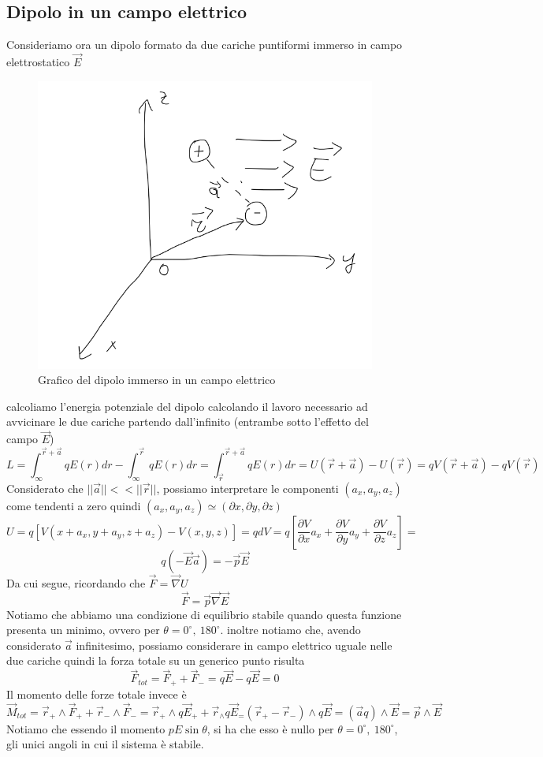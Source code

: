 \documentclass[10pt,a4paper]{article}
\begin{document}
\subsection{Dipolo in un campo elettrico}
Consideriamo ora un dipolo formato da due cariche puntiformi immerso in campo elettrostatico $\vec{E}$
\begin{figure}[h!]
	\centering
	\includegraphics[width=0.5\linewidth]{images/dipolo_campo_elettrico}
	\caption{Grafico del dipolo immerso in un campo elettrico}
	\label{fig:dipolocampoelettrico}
\end{figure}
\FloatBarrier
calcoliamo l'energia potenziale del dipolo calcolando il lavoro necessario ad avvicinare le due cariche partendo dall'infinito (entrambe sotto l'effetto del campo $\vec{E}$)
\[L = \int_{\infty}^{\vec{r}+\vec{a}} qE(r) dr -\int_{\infty}^{\vec{r}} qE(r) dr =\int_{\vec{r}}^{\vec{r}+\vec{a}} qE(r) dr= U(\vec{r}+\vec{a})-U(\vec{r}) = qV(\vec{r}+\vec{a})-qV(\vec{r})\]
Considerato che $||\vec{a}||<<||\vec{r}||$, possiamo interpretare le componenti \((a_x, a_y, a_z)\) come tendenti a zero quindi \((a_x, a_y, a_z)\simeq (\partial x, \partial y, \partial z)\)
\[U = q[V(x+a_x, y+a_y, z+a_z)-V(x, y, z)] = qdV = q\left[\frac{\partial V}{\partial x} a_x + \frac{\partial V}{\partial y}a_y + \frac{\partial V}{\partial z}a_z\right] =\]
\[ q(-\vec{E}\vec{a}) = -\vec{p}\vec{E}\]
Da cui segue, ricordando che \(\vec{F} = \vec{\nabla} U\)
\[\vec{F} = \vec{p}\vec{\nabla}\vec{E}\]
Notiamo che abbiamo una condizione di equilibrio stabile quando questa funzione presenta un minimo, ovvero per \(\theta= 0^\circ,\ 180^\circ\). inoltre notiamo che, avendo considerato $\vec{a}$ infinitesimo, possiamo considerare in campo elettrico uguale nelle due cariche quindi la forza totale su un generico punto risulta 
\[\vec{F}_{tot} =\vec{F}_++\vec{F}_- = q\vec{E}-q\vec{E} = 0\]
Il momento delle forze totale invece è
\[\vec{M}_{tot} = \vec{r}_+\wedge\vec{F}_+ + \vec{r}_-\wedge\vec{F}_- = \vec{r}_+\wedge q\vec{E}_+ + \vec{r}_\wedge q\vec{E}_ = (\vec{r}_+ - \vec{r}_-)\wedge q \vec{E} = (\vec{a}q)\wedge\vec{E} = \vec{p}\wedge\vec{E}\]
Notiamo che essendo il momento \(pE\sin\theta\), si ha che esso è nullo per \(\theta= 0^\circ,\ 180^\circ\), gli unici angoli in cui il sistema è stabile. 
\end{document}
